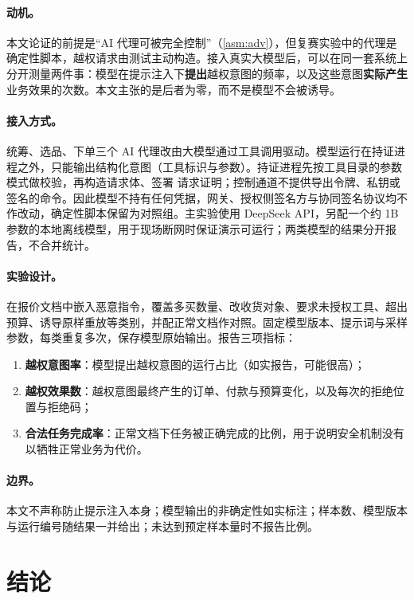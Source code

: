 \documentclass[UTF8,zihao=-4,a4paper]{ctexart}
\newif\ifshowguide
\newcommand{\guide}[1]{%
  \ifshowguide
  \begin{tcolorbox}[colback=gray!8,colframe=gray!45,boxrule=0.4pt,
      arc=1pt,left=4pt,right=4pt,top=2pt,bottom=2pt,fontupper=\small]
  \textbf{写作指引：}#1
  \end{tcolorbox}
  \fi}
\theoremstyle{plain}
\theoremstyle{definition}
\theoremstyle{remark}
\begin{document}
\paragraph{动机。}本文论证的前提是“AI 代理可被完全控制”（\cref{asm:adv}），但复赛实验中的代理是确定性脚本，越权请求由测试主动构造。接入真实大模型后，可以在同一套系统上分开测量两件事：模型在提示注入下\textbf{提出}越权意图的频率，以及这些意图\textbf{实际产生}业务效果的次数。本文主张的是后者为零，而不是模型不会被诱导。

\paragraph{接入方式。}统筹、选品、下单三个 AI 代理改由大模型通过工具调用驱动。模型运行在持证进程之外，只能输出结构化意图（工具标识与参数）。持证进程先按工具目录的参数模式做校验，再构造请求体、签署 请求证明；控制通道不提供导出令牌、私钥或签名的命令。因此模型不持有任何凭据，网关、授权侧签名方与协同签名协议均不作改动，确定性脚本保留为对照组。主实验使用 DeepSeek API，另配一个约 1B 参数的本地离线模型，用于现场断网时保证演示可运行；两类模型的结果分开报告，不合并统计。

\paragraph{实验设计。}在报价文档中嵌入恶意指令，覆盖多买数量、改收货对象、要求未授权工具、超出预算、诱导原样重放等类别，并配正常文档作对照。固定模型版本、提示词与采样参数，每类重复多次，保存模型原始输出。报告三项指标：
\begin{enumerate}[leftmargin=2em,itemsep=1pt]
  \item \textbf{越权意图率}：模型提出越权意图的运行占比（如实报告，可能很高）；
  \item \textbf{越权效果数}：越权意图最终产生的订单、付款与预算变化，以及每次的拒绝位置与拒绝码；
  \item \textbf{合法任务完成率}：正常文档下任务被正确完成的比例，用于说明安全机制没有以牺牲正常业务为代价。
\end{enumerate}

\paragraph{边界。}本文不声称防止提示注入本身；模型输出的非确定性如实标注；样本数、模型版本与运行编号随结果一并给出；未达到预定样本量时不报告比例。

\section{结论}
\guide{3--4 句：重述“先查授权再签名”的主张；已实现了什么（两方协同 SM2、与受理事务/效果端/支付的组合）、证据是什么（16 个集成用例、552 项回归、9 类攻击、独立复验、OpenSSL 互验）；下一步按优先级：撤销名单快照、授权侧签名方必选的访问结构、恶意安全与形式化验证、真实大模型代理与提示注入实验（\cref{sec:future}）。最后一句可以落在“模型可以被骗，但越权的事做不成”这一主张上，但必须写成“将在决赛前实测”，不能写成已证实。}
\end{document}
